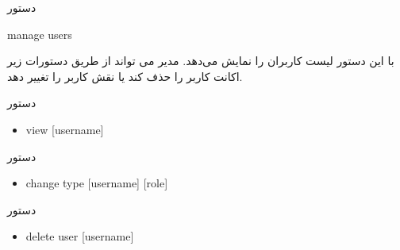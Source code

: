 \documentclass[]{article}
\begin{document}
\hrulefill


\begin{mybox}[colback=yellow]{دستور}

\begin{latin}

manage users

\end{latin}

\end{mybox}


با این دستور لیست کاربران را نمایش می‌دهد. مدیر می تواند از طریق دستورات زیر اکانت کاربر را حذف کند یا نقش کاربر را تغییر دهد.

\begin{mybox}[colback=brilliantlavender]{دستور}


\begin{latin}

\begin{itemize}[label = {$\Rightarrow$}]

\item
view [username]

\end{itemize}

\end{latin}

\end{mybox}



\begin{mybox}[colback=brilliantlavender]{دستور}


\begin{latin}

\begin{itemize}[label = {$\Rightarrow$}]

\item
change type [username] [role]

\end{itemize}

\end{latin}

\end{mybox}


\begin{mybox}[colback=brilliantlavender]{دستور}


\begin{latin}

\begin{itemize}[label = {$\Rightarrow$}]

\item
delete user [username]

\end{itemize}

\end{latin}

\end{mybox}
\end{document}
